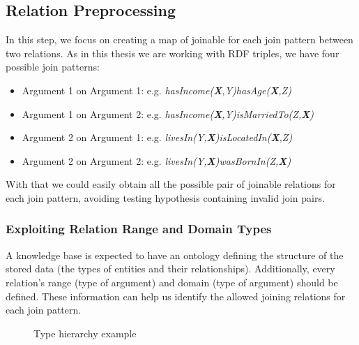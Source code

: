\subsection{Relation Preprocessing}

In this step, we focus on creating a map of joinable for each join pattern between two relations. As in this thesis we
are working with RDF triples, we have four possible join patterns:

\begin{itemize}
 \item Argument 1 on Argument 1: e.g. \emph{hasIncome(\textbf{X},Y)hasAge(\textbf{X},Z)}
 \item Argument 1 on Argument 2: e.g. \emph{hasIncome(\textbf{X},Y)isMarriedTo(Z,\textbf{X})}
 \item Argument 2 on Argument 1: e.g. \emph{livesIn(Y,\textbf{X})isLocatedIn(\textbf{X},Z)}
 \item Argument 2 on Argument 2: e.g. \emph{livesIn(Y,\textbf{X})wasBornIn(Z,\textbf{X})}
\end{itemize}

With that we could easily obtain all the possible pair of joinable relations for each join pattern, avoiding testing
hypothesis containing invalid join pairs.

\subsubsection{Exploiting Relation Range and Domain Types}

A knowledge base is expected to have an ontology defining the structure of the stored data (the types of entities and
their relationships). Additionally, every relation's range (type of  argument) and domain (type of 
argument) should be defined. These information can help us identify the allowed joining relations for each join
pattern.

\begin{figure}[h!]
  \label{fig:hierarchy}
  \caption{Type hierarchy example}
  \centering

\label{fig:typeHierarchy}
\end{figure}

